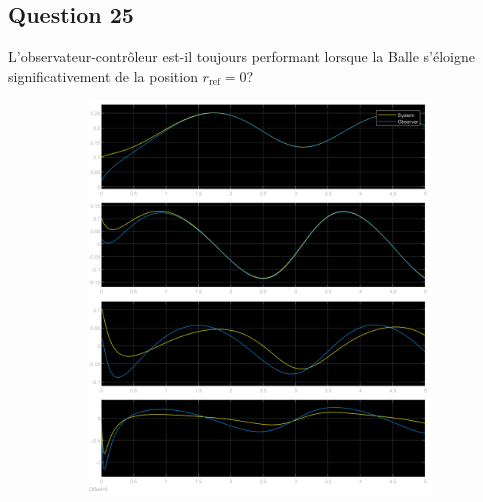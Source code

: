 \documentclass[class=article, crop=false]{standalone}
\begin{document}
\subsection{Question 25}
\begin{exercise}
    L'observateur-contrôleur est-il toujours performant lorsque la Balle s'éloigne significativement de la position $r_{\text{ref}} = 0$?
\end{exercise}
\begin{resolution}
    \begin{figure}[H]
        \centering
        \begin{subfigure}[b]{0.475\textwidth}
            \centering
            \includegraphics[width=\textwidth]{../images/simulink_scope5_02_1_02.png}
            \caption{}
        \end{subfigure}
        \begin{subfigure}[b]{0.475\textwidth}
            \centering

\end{subfigure}
\end{figure}
\end{resolution}
\end{document}
